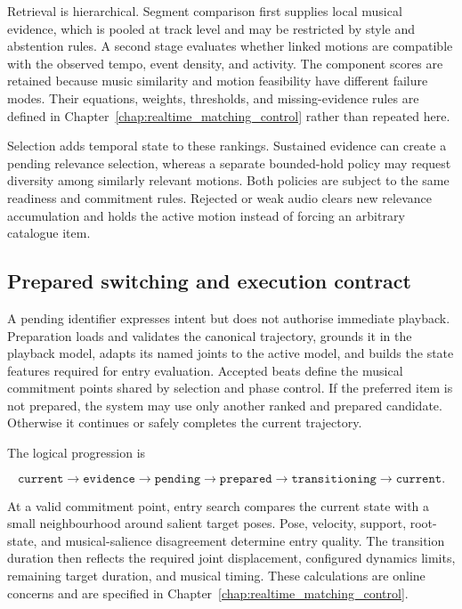 Retrieval is hierarchical. Segment comparison first supplies local musical
evidence, which is pooled at track level and may be restricted by style and
abstention rules. A second stage evaluates whether linked motions are compatible
with the observed tempo, event density, and activity. The component scores are
retained because music similarity and motion feasibility have different
failure modes. Their equations, weights, thresholds, and missing-evidence rules
are defined in Chapter~\ref{chap:realtime_matching_control} rather than repeated
here.

Selection adds temporal state to these rankings. Sustained evidence can create
a pending relevance selection, whereas a separate bounded-hold policy may
request diversity among similarly relevant motions. Both policies are subject
to the same readiness and commitment rules. Rejected or weak audio clears new
relevance accumulation and holds the active motion instead of forcing an
arbitrary catalogue item.

\subsection{Prepared switching and execution contract}
\label{subsec:design_execution_contract}

A pending identifier expresses intent but does not authorise immediate
playback. Preparation loads and validates the canonical trajectory, grounds it
in the playback model, adapts its named joints to the active model, and builds
the state features required for entry evaluation. Accepted beats define the
musical commitment points shared by selection and phase control. If the
preferred item is not prepared, the system may use only another ranked and
prepared candidate. Otherwise it continues or safely completes the current
trajectory.

The logical progression is

\begin{equation}
    \texttt{current}
    \rightarrow \texttt{evidence}
    \rightarrow \texttt{pending}
    \rightarrow \texttt{prepared}
    \rightarrow \texttt{transitioning}
    \rightarrow \texttt{current}.
\label{eq:switch_state_sequence}
\end{equation}

At a valid commitment point, entry search compares the current state with a
small neighbourhood around salient target poses. Pose, velocity, support,
root-state, and musical-salience disagreement determine entry quality. The
transition duration then reflects the required joint displacement, configured
dynamics limits, remaining target duration, and musical timing. These
calculations are online concerns and are specified in
Chapter~\ref{chap:realtime_matching_control}.

